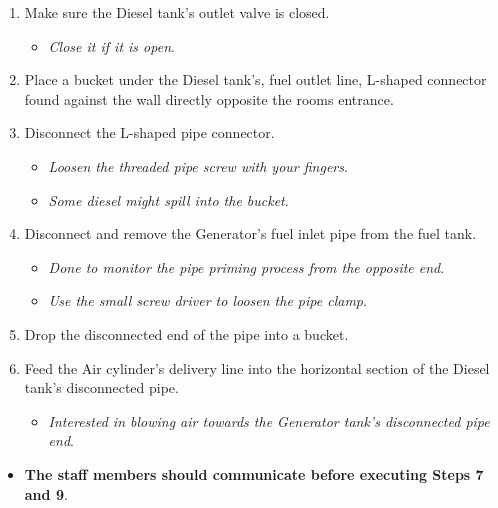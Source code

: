 \documentclass[
  12pt,
]{report}
\providecommand{\tightlist}{%
  \setlength{\itemsep}{0pt}\setlength{\parskip}{0pt}}\usepackage{longtable,booktabs,array}
\begin{document}
\begin{enumerate}
\def\labelenumi{\arabic{enumi}.}
\tightlist
\item
  Make sure the Diesel tank's outlet valve is closed.

  \begin{itemize}
  \tightlist
  \item
    \emph{Close it if it is open}.
  \end{itemize}
\item
  Place a bucket under the Diesel tank's, fuel outlet line, L-shaped
  connector found against the wall directly opposite the rooms entrance.
\item
  Disconnect the L-shaped pipe connector.

  \begin{itemize}
  \tightlist
  \item
    \emph{Loosen the threaded pipe screw with your fingers}.
  \item
    \emph{Some diesel might spill into the bucket}.
  \end{itemize}
\item
  Disconnect and remove the Generator's fuel inlet pipe from the fuel
  tank.

  \begin{itemize}
  \tightlist
  \item
    \emph{Done to monitor the pipe priming process from the opposite
    end}.
  \item
    \emph{Use the small screw driver to loosen the pipe clamp}.
  \end{itemize}
\item
  Drop the disconnected end of the pipe into a bucket.
\item
  Feed the Air cylinder's delivery line into the horizontal section of
  the Diesel tank's disconnected pipe.

  \begin{itemize}
  \tightlist
  \item
    \emph{Interested in blowing air towards the Generator tank's
    disconnected pipe end}.
  \end{itemize}
\end{enumerate}

\begin{itemize}
\tightlist
\item
  \textbf{The staff members should communicate before executing Steps 7
  and 9}.
\end{itemize}
\end{document}
